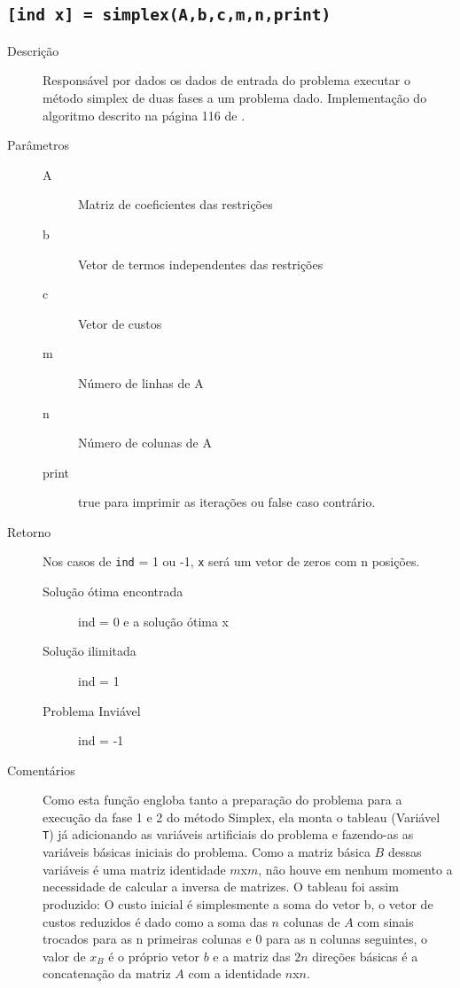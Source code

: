 \documentclass[brazil,times]{abnt}
\begin{document}
\subsection*{\texttt{[ind x] = simplex(A,b,c,m,n,print)}}
\begin{description}
	\item[Descrição] Responsável por dados os dados de entrada do problema executar o método simplex de duas fases a um problema dado. Implementação do algoritmo descrito na página 116 de \cite{Bertsimas:1997:ILO:548834}.
	\item[Parâmetros] 
		\begin{description}
		 \item[A] Matriz de coeficientes das restrições
		 \item[b] Vetor de termos independentes das restrições
		 \item[c] Vetor de custos
		 \item[m] Número de linhas de A
		 \item[n] Número de colunas de A
		 \item[print] true para imprimir as iterações ou false caso contrário.
		\end{description}
	\item[Retorno]
		Nos casos de \texttt{ind} = 1 ou -1, \texttt{x} será um vetor de zeros com n posições.
		\begin{description}
		 \item[Solução ótima encontrada] ind = 0 e a solução ótima x
		 \item[Solução ilimitada] ind = 1
		 \item[Problema Inviável] ind = -1
		\end{description}
	\item[Comentários] Como esta função engloba tanto a preparação do problema para a execução da fase 1 e 2 do método Simplex, ela monta o tableau (Variável \texttt{T}) já adicionando as variáveis artificiais do problema e fazendo-as as variáveis básicas iniciais do problema. Como a matriz básica $B$ dessas variáveis é uma matriz identidade $m$x$m$, não houve em nenhum momento a necessidade de calcular a inversa de matrizes. O tableau foi assim produzido: O custo inicial é simplesmente a soma do vetor b, o vetor de custos reduzidos é dado como a soma das $n$ colunas de $A$ com sinais trocados para as n primeiras colunas e 0 para as n colunas seguintes, o valor de $x_B$ é o próprio vetor $b$ e a matriz das $2n$ direções básicas é a concatenação da matriz $A$ com a identidade $n$x$n$.
\end{description}
\end{document}
